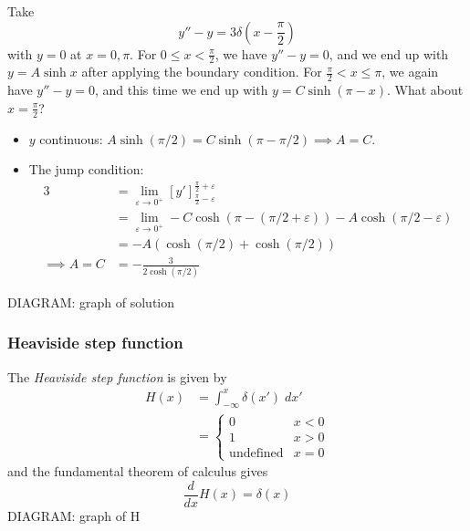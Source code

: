 \documentclass{../../template/note}
\begin{document}
    \begin{example}
        Take
        \[
            y'' - y = 3\delta\left(x-\frac{\pi}{2}\right)
        \]
        with \(y = 0\) at \(x = 0, \pi\). For \(0 \leq x < \frac{\pi}{2}\), we have \(y'' - y = 0\), and we end up with \(y = A \sinh x\) after applying the boundary condition. For \(\frac{\pi}{2} < x \leq \pi\), we again have \(y'' - y = 0\), and this time we end up with \(y = C \sinh(\pi - x)\). What about \(x = \frac{\pi}{2}\)?
        \begin{itemize}
            \item \(y\) continuous: \(A \sinh(\pi/2) = C\sinh(\pi - \pi/2) \implies A = C\).
            \item The jump condition:
            \begin{align*}
                3 &= \lim_{\varepsilon \to 0^+} \left[y'\right]_{\frac{\pi}{2} - \varepsilon}^{\frac{\pi}{2} + \varepsilon} \\
                &= \lim_{\varepsilon \to 0^+} -C \cosh(\pi - (\pi/2 + \varepsilon)) -A \cosh(\pi/2 - \varepsilon) \\
                &= -A(\cosh(\pi/2) + \cosh(\pi/2)) \\
                \implies A = C &= -\frac{3}{2 \cosh(\pi/2)}
            \end{align*}           
        \end{itemize}
        DIAGRAM: graph of solution
    \end{example}
    
    \subsubsection{Heaviside step function}

    \begin{definition}
        The \emph{Heaviside step function} is given by
        \begin{align*}
            H(x) &= \int_{-\infty}^x \delta(x') \; dx' \\
            &= \begin{cases}
                0 & x < 0 \\
                1 & x > 0 \\
                \text{undefined} & x = 0
            \end{cases}
        \end{align*}
        and the fundamental theorem of calculus gives
        \[
            \frac{d}{dx} H(x) = \delta(x)
        \]
        DIAGRAM: graph of H
    \end{definition}
    
\end{document}

